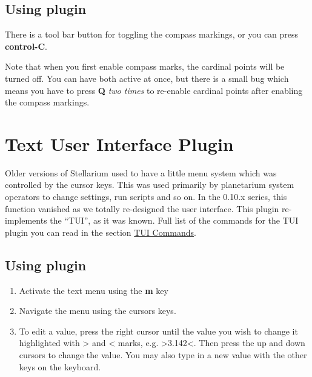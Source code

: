 \subsection{Using plugin}\label{using-plugin-2}

There is a tool bar button for toggling the compass markings, or you can
press \textbf{control-C}.

Note that when you first enable compass marks, the cardinal points will
be turned off. You can have both active at once, but there is a small
bug which means you have to press \textbf{Q} \emph{two times} to
re-enable cardinal points after enabling the compass markings.

\section{Text User Interface Plugin}\label{text-user-interface-plugin}


Older versions of Stellarium used to have a little menu system which was
controlled by the cursor keys. This was used primarily by planetarium
system operators to change settings, run scripts and so on. In the
0.10.x series, this function vanished as we totally re-designed the user
interface. This plugin re-implements the ``TUI'', as it was known. Full
list of the commands for the TUI plugin you can read in the section
\href{TUI_Commands}{TUI Commands}.

\subsection{Using plugin}\label{using-plugin-3}

\begin{enumerate}
\item
  Activate the text menu using the \textbf{m} key
\item
  Navigate the menu using the cursors keys.
\item
  To edit a value, press the right cursor until the value you wish to
  change it highlighted with \textgreater{} and \textless{} marks, e.g.
  \textgreater{}3.142\textless{}. Then press the up and down cursors to
  change the value. You may also type in a new value with the other keys
  on the keyboard.
\end{enumerate}


